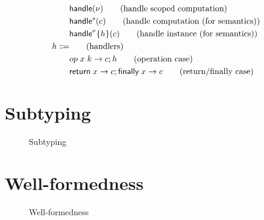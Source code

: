 {\begin{align*}
									& \mathsf{handle} ( \nu )										\tag{handle scoped computation} \\
									& \mathsf{handle}^{s} ( c )								\tag{handle computation (for semantics)} \\
									& \mathsf{handle}^{\nu} \{ h \} ( c )	\tag{handle instance (for semantics)} \\
	h \Coloneqq 		&															\tag{handlers} \\
									& op \; x \; k \rightarrow c ; h	\tag{operation case} \\
									& \mathsf{return} \; x \rightarrow c ; \mathsf{finally} \; x \rightarrow c			\tag{return/finally case} \\
\end{align*}

\section{Subtyping}
\begin{figure}
\caption{Subtyping}
\centering
{}
\end{figure}

\section{Well-formedness}
\begin{figure}
\caption{Well-formedness}
\centering
{}
\end{figure}

}
